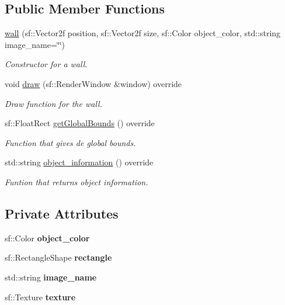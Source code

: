 \subsection*{Public Member Functions}
\begin{DoxyCompactItemize}
\item 
\hyperlink{classwall_ac9c0db974e7839223fc4eb18c51dac62}{wall} (sf\+::\+Vector2f position, sf\+::\+Vector2f size, sf\+::\+Color object\+\_\+color, std\+::string image\+\_\+name=\char`\"{}\char`\"{})
\begin{DoxyCompactList}\small\item\em Constructor for a wall. \end{DoxyCompactList}\item 
void \hyperlink{classwall_aa25b8377e1d9a209fabd2271294f05d0}{draw} (sf\+::\+Render\+Window \&window) override
\begin{DoxyCompactList}\small\item\em Draw function for the wall. \end{DoxyCompactList}\item 
sf\+::\+Float\+Rect \hyperlink{classwall_a317a464c879cfdf9464bd6f1b62d9101}{get\+Global\+Bounds} () override
\begin{DoxyCompactList}\small\item\em Function that gives de global bounds. \end{DoxyCompactList}\item 
std\+::string \hyperlink{classwall_aab1de4f144f176b134a967ba08747932}{object\+\_\+information} () override
\begin{DoxyCompactList}\small\item\em Funtion that returns object information. \end{DoxyCompactList}\end{DoxyCompactItemize}
\subsection*{Private Attributes}
\begin{DoxyCompactItemize}
\item 
\mbox{\label{classwall_ada0e26614b5f30c0f675d179d517bafb}} 
sf\+::\+Color {\bfseries object\+\_\+color}
\item 
\mbox{\label{classwall_a29b74cbef8c1cb110c526fdf4a8f48ba}} 
sf\+::\+Rectangle\+Shape {\bfseries rectangle}
\item 
\mbox{\label{classwall_acab3382f9e7092cf8bb62a5f88586d92}} 
std\+::string {\bfseries image\+\_\+name}
\item 
\mbox{\label{classwall_a03e6d768bc82f6320d85f19ce0346f95}} 
sf\+::\+Texture {\bfseries texture}
\end{DoxyCompactItemize}
